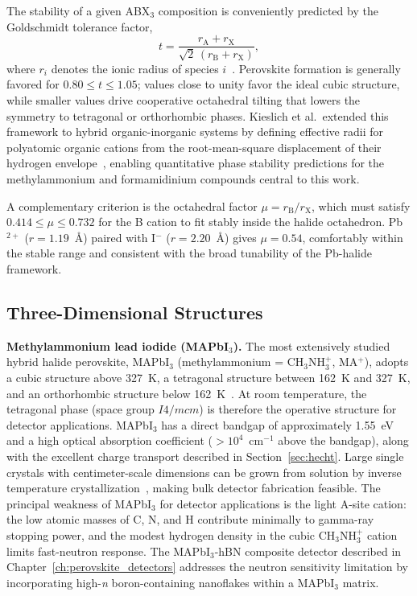 The stability of a given ABX$_3$ composition is conveniently predicted by
the Goldschmidt tolerance factor,
\begin{equation}
  t = \frac{r_{\mathrm{A}} + r_{\mathrm{X}}}{\sqrt{2}\,(r_{\mathrm{B}} + r_{\mathrm{X}})},
  \label{eq:tolerance}
\end{equation}
where $r_i$ denotes the ionic radius of species $i$~\cite{Goldschmidt1926}.
Perovskite formation is generally favored for $0.80 \le t \le 1.05$;
values close to unity favor the ideal cubic structure, while smaller
values drive cooperative octahedral tilting that lowers the symmetry to
tetragonal or orthorhombic phases.  Kieslich et al.\ extended this
framework to hybrid organic-inorganic systems by defining effective radii
for polyatomic organic cations from the root-mean-square displacement of
their hydrogen envelope~\cite{Kieslich2015}, enabling quantitative phase
stability predictions for the methylammonium and formamidinium compounds
central to this work.

A complementary criterion is the octahedral factor $\mu = r_{\mathrm{B}}/r_{\mathrm{X}}$,
which must satisfy $0.414 \le \mu \le 0.732$ for the B cation to fit stably
inside the halide octahedron.  Pb$^{2+}$ ($r = 1.19$~\AA) paired with
I$^{-}$ ($r = 2.20$~\AA) gives $\mu = 0.54$, comfortably within the stable
range and consistent with the broad tunability of the Pb-halide framework.

\subsection{Three-Dimensional Structures}

\textbf{Methylammonium lead iodide (MAPbI$_3$).}
The most extensively studied hybrid halide perovskite, MAPbI$_3$
(methylammonium = CH$_3$NH$_3^+$, MA$^+$), adopts a cubic structure
above 327~K, a tetragonal structure between 162~K and 327~K, and an
orthorhombic structure below 162~K~\cite{Baikie2013}.  At room temperature,
the tetragonal phase (space group $I4/mcm$) is therefore the operative
structure for detector applications.  MAPbI$_3$ has a direct bandgap of
approximately 1.55~eV and a high optical absorption coefficient
($>10^4$~cm$^{-1}$ above the bandgap), along with the excellent charge
transport described in Section~\ref{sec:hecht}.  Large single crystals
with centimeter-scale dimensions can be grown from solution by inverse
temperature crystallization~\cite{Saidaminov2015}, making bulk detector
fabrication feasible.  The principal weakness of MAPbI$_3$ for detector
applications is the light A-site cation: the low atomic masses of C, N,
and H contribute minimally to gamma-ray stopping power, and the modest
hydrogen density in the cubic CH$_3$NH$_3^+$ cation limits fast-neutron
response.  The MAPbI$_3$-hBN composite detector described in
Chapter~\ref{ch:perovskite_detectors} addresses the neutron sensitivity limitation
by incorporating high-\emph{n} boron-containing nanoflakes within a
MAPbI$_3$ matrix.

